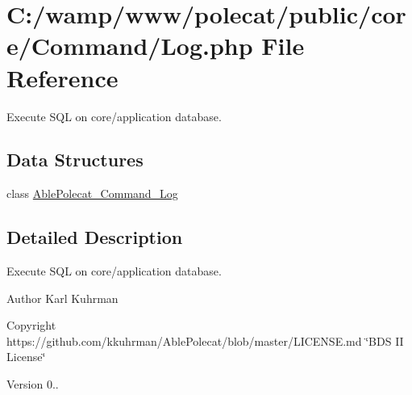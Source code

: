 \hypertarget{_command_2_log_8php}{}\section{C\+:/wamp/www/polecat/public/core/\+Command/\+Log.php File Reference}
\label{_command_2_log_8php}


Execute S\+Q\+L on core/application database.  


\subsection*{Data Structures}
\begin{DoxyCompactItemize}
\item 
class \hyperlink{class_able_polecat___command___log}{Able\+Polecat\+\_\+\+Command\+\_\+\+Log}
\end{DoxyCompactItemize}


\subsection{Detailed Description}
Execute S\+Q\+L on core/application database. 

\begin{DoxyAuthor}{Author}
Karl Kuhrman 
\end{DoxyAuthor}
\begin{DoxyCopyright}{Copyright}
https\+://github.com/kkuhrman/\+Able\+Polecat/blob/master/\+L\+I\+C\+E\+N\+S\+E.\+md \char`\"{}\+B\+D\+S I\+I License\char`\"{} 
\end{DoxyCopyright}
\begin{DoxyVersion}{Version}
0.. 
\end{DoxyVersion}
